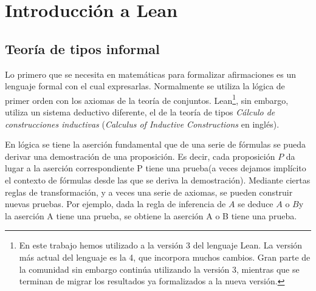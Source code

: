 \section{Introducci\'{o}n a Lean}

\subsection{Teoría de tipos informal}

Lo primero que se necesita en matemáticas para formalizar afirmaciones es
un lenguaje formal con el cual expresarlas. Normalmente se utiliza la lógica de
primer orden con los axiomas de la teoría de conjuntos.
Lean\footnote{En este trabajo hemos utilizado a la versión 3 del
	lenguaje Lean. La versión más actual del lenguaje es la 4, que
	incorpora muchos cambios. Gran parte de la comunidad sin embargo continúa
	utilizando la versión 3, mientras que se terminan de migrar los resultados ya
	formalizados a la nueva versión.}, sin embargo, utiliza un sistema deductivo
diferente, el de la teoría de tipos \textit{Cálculo de construcciones
	inductivas} (\textit{Calculus of Inductive Constructions} en inglés).

En lógica se tiene la aserción fundamental \guillemotleft que de una serie de
fórmulas se pueda derivar una demostración de una proposición\guillemotright. Es
decir, cada proposición $P$ da lugar a la aserción correspondiente
\guillemotleft P tiene una prueba\guillemotright (a veces dejamos implícito el
contexto de fórmulas desde las que se deriva la demostración). Mediante ciertas
reglas de transformación, y a veces una serie de axiomas, se pueden construir
nuevas pruebas. Por ejemplo, dada la regla de inferencia \guillemotleft de $A$
se deduce $A$ o $B$\guillemotright y la aserción \guillemotleft A tiene una
prueba\guillemotright, se obtiene la aserción \guillemotleft A o B tiene una
prueba\guillemotright.

